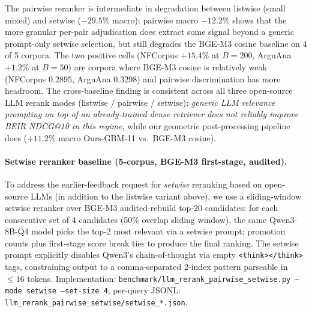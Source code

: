 \documentclass[review,1p]{elsarticle}
\begin{document}
The pairwise reranker is intermediate in degradation between listwise (small mixed) and setwise ($-29.5\%$ macro): pairwise macro $-12.2\%$ shows that the more granular per-pair adjudication does extract some signal beyond a generic prompt-only setwise selection, but still degrades the BGE-M3 cosine baseline on 4 of 5 corpora. The two positive cells (NFCorpus $+15.4\%$ at $B=200$, ArguAna $+1.2\%$ at $B=50$) are corpora where BGE-M3 cosine is relatively weak (NFCorpus $0.2895$, ArguAna $0.3298$) and pairwise discrimination has more headroom. The cross-baseline finding is consistent across all three open-source LLM rerank modes (listwise / pairwise / setwise): \emph{generic LLM relevance prompting on top of an already-trained dense retriever does not reliably improve BEIR NDCG@10 in this regime}, while our geometric post-processing pipeline does ($+11.2\%$ macro Ours-GBM-11 vs.\ BGE-M3 cosine).

\paragraph{Setwise reranker baseline (5-corpus, BGE-M3 first-stage, audited).} To address the earlier-feedback request for \emph{setwise} reranking based on open-source LLMs (in addition to the listwise variant above), we use a sliding-window setwise reranker over BGE-M3 audited-rebuild top-20 candidates: for each consecutive set of 4 candidates (50\% overlap sliding window), the same Qwen3-8B-Q4 model picks the top-2 most relevant via a setwise prompt; promotion counts plus first-stage score break ties to produce the final ranking. The setwise prompt explicitly disables Qwen3's chain-of-thought via empty \texttt{<think></think>} tags, constraining output to a comma-separated 2-index pattern parseable in $\le 16$ tokens. Implementation: \texttt{benchmark/llm\_rerank\_pairwise\_setwise.py --mode setwise --set-size 4}; per-query JSONL: \texttt{llm\_rerank\_pairwise\_setwise/setwise\_*.json}.
\end{document}
